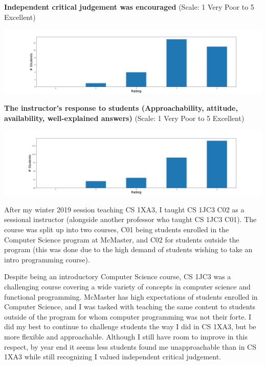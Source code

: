 \documentclass[12pt]{report}
\begin{document}
\noindent
\textbf{Independent critical judgement was encouraged} (Scale: 1 Very Poor to 5 Excellent)

\begin{center}
\includegraphics[width=1.0\textwidth,height=0.5\textwidth]{./course-evals/Eval_1JC3_2019_Critical.png}
\end{center}

\newpage
\noindent
\textbf{The instructor's response to students (Approachability, attitude,
availability, well-explained answers)} (Scale: 1 Very Poor to 5 Excellent)

\begin{center}
\includegraphics[width=1.0\textwidth,height=0.5\textwidth]{./course-evals/Eval_1JC3_2019_Response.png}
\end{center}

After my winter 2019 session teaching CS 1XA3, I taught CS 1JC3 C02 as a
sessional instructor (alongside another professor who taught CS 1JC3 C01).
The course was split up into two courses, C01 being students enrolled in the
Computer Science program at McMaster, and C02 for students outside the
program (this was done due to the high demand of students wishing to
take an intro programming course). 

Despite being an introductory Computer Science course, CS 1JC3 was a
challenging course covering a wide variety of concepts in computer science
and functional programming. McMaster has high expectations of students
enrolled in Computer Science, and I was tasked with teaching the same content
to students outside of the program for whom computer programming was not
their forte. I did my best to continue to challenge students the way I did in
CS 1XA3, but be more flexible and approachable. Although I still have room to
improve in this respect, by year end it seems less students found me
unapproachable than in CS 1XA3 while still recognizing I valued independent
critical judgement.
\end{document}
